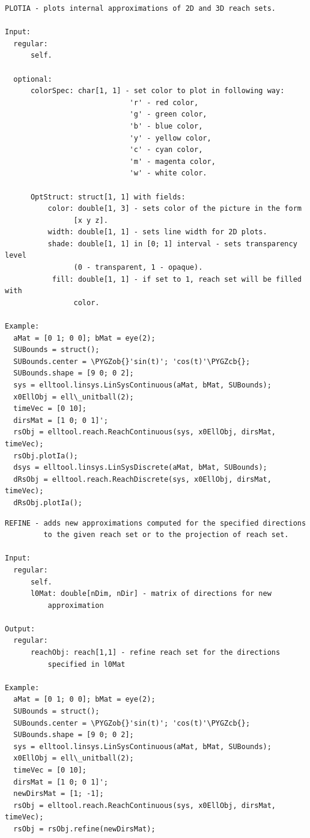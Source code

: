 \documentclass[letterpaper,10pt,english]{sphinxmanual}
\def\PYGZob{\char`\{}
\def\PYGZcb{\char`\}}
\begin{document}
\begin{Verbatim}[commandchars=\\\{\}]
PLOTIA - plots internal approximations of 2D and 3D reach sets.

Input:
  regular:
      self.

  optional:
      colorSpec: char[1, 1] - set color to plot in following way:
                             'r' - red color,
                             'g' - green color,
                             'b' - blue color,
                             'y' - yellow color,
                             'c' - cyan color,
                             'm' - magenta color,
                             'w' - white color.

      OptStruct: struct[1, 1] with fields:
          color: double[1, 3] - sets color of the picture in the form
                [x y z].
          width: double[1, 1] - sets line width for 2D plots.
          shade: double[1, 1] in [0; 1] interval - sets transparency level
                (0 - transparent, 1 - opaque).
           fill: double[1, 1] - if set to 1, reach set will be filled with
                color.

Example:
  aMat = [0 1; 0 0]; bMat = eye(2);
  SUBounds = struct();
  SUBounds.center = \PYGZob{}'sin(t)'; 'cos(t)'\PYGZcb{};
  SUBounds.shape = [9 0; 0 2];
  sys = elltool.linsys.LinSysContinuous(aMat, bMat, SUBounds);
  x0EllObj = ell\_unitball(2);
  timeVec = [0 10];
  dirsMat = [1 0; 0 1]';
  rsObj = elltool.reach.ReachContinuous(sys, x0EllObj, dirsMat, timeVec);
  rsObj.plotIa();
  dsys = elltool.linsys.LinSysDiscrete(aMat, bMat, SUBounds);
  dRsObj = elltool.reach.ReachDiscrete(sys, x0EllObj, dirsMat, timeVec);
  dRsObj.plotIa();
\end{Verbatim}
\label{chap_func:elltool-reach-areach-refine}
\begin{Verbatim}[commandchars=\\\{\}]
REFINE - adds new approximations computed for the specified directions
         to the given reach set or to the projection of reach set.

Input:
  regular:
      self.
      l0Mat: double[nDim, nDir] - matrix of directions for new
          approximation

Output:
  regular:
      reachObj: reach[1,1] - refine reach set for the directions
          specified in l0Mat

Example:
  aMat = [0 1; 0 0]; bMat = eye(2);
  SUBounds = struct();
  SUBounds.center = \PYGZob{}'sin(t)'; 'cos(t)'\PYGZcb{};
  SUBounds.shape = [9 0; 0 2];
  sys = elltool.linsys.LinSysContinuous(aMat, bMat, SUBounds);
  x0EllObj = ell\_unitball(2);
  timeVec = [0 10];
  dirsMat = [1 0; 0 1]';
  newDirsMat = [1; -1];
  rsObj = elltool.reach.ReachContinuous(sys, x0EllObj, dirsMat, timeVec);
  rsObj = rsObj.refine(newDirsMat);
\end{Verbatim}
\end{document}
